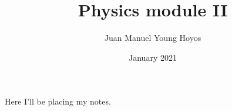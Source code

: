 \documentclass{article}
\title{Physics module II}
\author{Juan Manuel Young Hoyos}
\date{January 2021}
\begin{document}
   \maketitle
   Here I'll be placing my notes.
\end{document}

